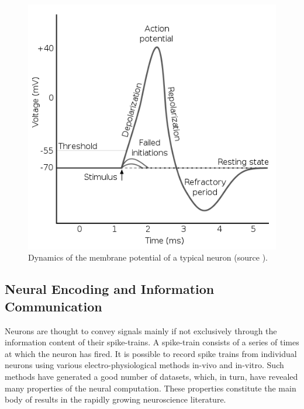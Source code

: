 \begin{figure}
		\centering
		\includegraphics[width=0.6\linewidth]{fig/snn/action_potential.png}
		\caption{Dynamics of the membrane potential of a typical neuron (source \citet{Afterhyperpolarization}).}
		\label{fig:action_potential}
	\end{figure}

\subsection{Neural Encoding and Information Communication}
Neurons are thought to convey signals mainly if not exclusively through the information content of their spike-trains. A spike-train consists of a series of times at which the neuron has fired. It is possible to record spike trains from individual neurons using various electro-physiological methods in-vivo and in-vitro. Such methods have generated a good number of datasets, which, in turn, have revealed many properties of the neural computation. These properties constitute the main body of results in the rapidly growing neuroscience literature.

